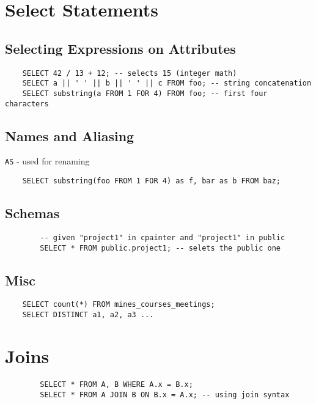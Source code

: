 \documentclass{../cheatsheet}
\begin{document}
\begin{multicols*}{2}
    \section{Select Statements}
    \subsection{Selecting Expressions on Attributes}
    \begin{verbatim}
    SELECT 42 / 13 + 12; -- selects 15 (integer math)
    SELECT a || ' ' || b || ' ' || c FROM foo; -- string concatenation
    SELECT substring(a FROM 1 FOR 4) FROM foo; -- first four characters
    \end{verbatim}

    \subsection{Names and Aliasing}
    \texttt{AS} - used for renaming

    \begin{verbatim}
    SELECT substring(foo FROM 1 FOR 4) as f, bar as b FROM baz;
    \end{verbatim}

    \subsection{Schemas}
    \begin{verbatim}
        -- given "project1" in cpainter and "project1" in public
        SELECT * FROM public.project1; -- selets the public one
    \end{verbatim}

    \subsection{Misc}
    \begin{verbatim}
    SELECT count(*) FROM mines_courses_meetings;
    SELECT DISTINCT a1, a2, a3 ...
    \end{verbatim}

    \section{Joins}
    \begin{verbatim}
        SELECT * FROM A, B WHERE A.x = B.x;
        SELECT * FROM A JOIN B ON B.x = A.x; -- using join syntax
    \end{verbatim}


\end{multicols*}
\end{document}
